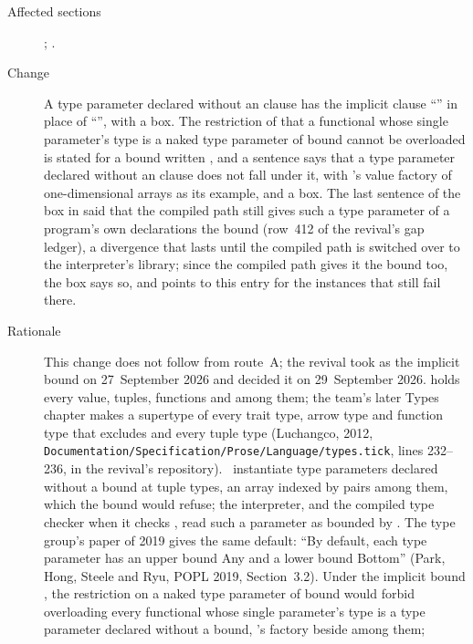 \begin{description}
\item[Affected sections] ; .
\item[Change] A type parameter declared without an  clause has the
implicit clause ``'' in place of
``'', with a box.
The restriction of  that a functional whose
single parameter's type is a naked type parameter of bound  cannot be
overloaded is stated for a bound written , and a sentence says that a
type parameter declared without an  clause does not fall under it,
with \library's value factory of one-dimensional arrays as its example, and a
box.
The last sentence of the box in  said that the compiled path
still gives such a type parameter of a program's own declarations the bound
 (row~412 of the revival's gap ledger), a divergence that lasts
until the compiled path is switched over to the interpreter's library; since the
compiled path gives it the bound  too, the box says so, and points to
this entry for the instances that still fail there.
\item[Rationale] This change does not follow from route~A; the revival took
 as the implicit bound on 27~September 2026 and decided it on
29~September 2026.
 holds every value, tuples, functions and \TYP{()} among them; the
team's later Types chapter makes  a supertype of every trait type,
arrow type and function type that excludes \TYP{()} and every tuple type
(Luchangco, 2012,
\nolinkurl{Documentation/Specification/Prose/Language/types.tick}, lines
232--236, in the revival's repository).
\Library\ instantiate type parameters declared without a bound at tuple types,
an array indexed by pairs among them, which the bound  would refuse;
the interpreter, and the compiled type checker when it checks \library, read
such a parameter as bounded by .
The type group's paper of 2019 gives the same default: ``By default, each type
parameter has an upper bound Any and a lower bound Bottom'' (Park, Hong, Steele
and Ryu, POPL 2019, Section~3.2).
Under the implicit bound , the restriction on a naked type parameter of
bound  would forbid overloading every functional whose single
parameter's type is a type parameter declared without a bound, \library's
factory 
beside  among them;

\end{description}
